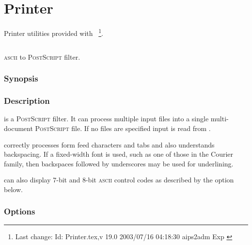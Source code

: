 \chapter{Printer}
\label{Printer}

Printer utilities provided with \aipspp\ \footnote{Last change:
$ $Id: Printer.tex,v 19.0 2003/07/16 04:18:30 aips2adm Exp $ $}.


\section{}
\label{lwfa}

\textsc{ascii} to \textsc{PostScript} filter.

\subsection*{Synopsis}

\begin{synopsis}
\end{synopsis}

\subsection*{Description}

 is a \textsc{PostScript} filter.  It can process multiple input
files into a single multi-document \textsc{PostScript} file.  If no files are
specified input is read from .

 correctly processes form feed characters and tabs and also
understands backspacing.  If a fixed-width font is used, such as one of those
in the Courier family, then backspaces followed by underscores may be used for
underlining.

 can also display 7-bit and 8-bit \textsc{ascii} control codes as
described by the  option below.

\subsection*{Options}

